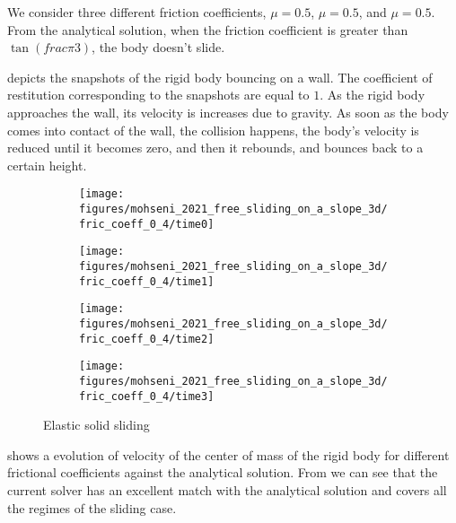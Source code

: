 \documentclass[preprint,12pt]{elsarticle}
\begin{document}
We consider three different friction coefficients, $\mu=0.5$, $\mu=0.5$, and
$\mu=0.5$. From the analytical solution, when the friction coefficient is
greater than $\tan(frac{\pi}{3})$, the body doesn't slide.

 depicts the snapshots of the
rigid body bouncing on a wall. The coefficient of restitution corresponding to
the snapshots are equal to $1$. As the rigid body approaches the wall, its
velocity is increases due to gravity. As soon as the body comes into contact
of the wall, the collision happens, the body's velocity is reduced until it
becomes zero, and then it rebounds, and bounces back to a certain height.



\begin{figure}[!htpb]
  \centering
  \begin{subfigure}{0.48\textwidth}
    \centering
    \texttt{[image: figures/mohseni\_2021\_free\_sliding\_on\_a\_slope\_3d/fric\_coeff\_0\_4/time0]}
    \label{fig:passing-0}
  \end{subfigure}
  \begin{subfigure}{0.48\textwidth}
    \centering
    \texttt{[image: figures/mohseni\_2021\_free\_sliding\_on\_a\_slope\_3d/fric\_coeff\_0\_4/time1]}
    \label{fig:passing-1}
  \end{subfigure}

  \begin{subfigure}{0.48\textwidth}
    \centering
    \texttt{[image: figures/mohseni\_2021\_free\_sliding\_on\_a\_slope\_3d/fric\_coeff\_0\_4/time2]}
    \label{fig:passing-2}
  \end{subfigure}
  \begin{subfigure}{0.48\textwidth}
    \centering
    \texttt{[image: figures/mohseni\_2021\_free\_sliding\_on\_a\_slope\_3d/fric\_coeff\_0\_4/time3]}
    \label{fig:passing-3}
  \end{subfigure}
  \caption{Elastic solid sliding}
\label{fig:mohseni-2021-sliding-3d}
\end{figure}
%

 shows a evolution of
velocity of the center of mass of the rigid body for different frictional
coefficients against the analytical solution. From
 we can see that the current
solver has an excellent match with the analytical solution and covers all the
regimes of the sliding case.
\end{document}
